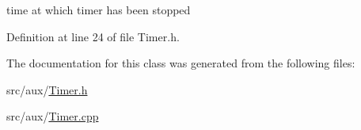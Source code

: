 time at which timer has been stopped 



Definition at line 24 of file Timer.\-h.



The documentation for this class was generated from the following files\-:\begin{DoxyCompactItemize}
\item 
src/aux/\hyperlink{_timer_8h}{Timer.\-h}\item 
src/aux/\hyperlink{_timer_8cpp}{Timer.\-cpp}\end{DoxyCompactItemize}

